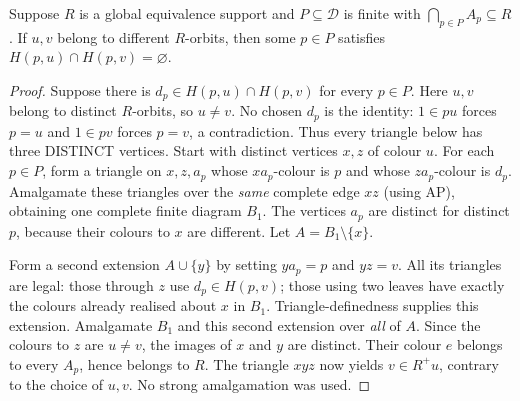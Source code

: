 \begin{lemma}\label{lem:rh-separator}
Suppose $R$ is a global equivalence support and $P\subseteq\mathcal D$
is finite with $\bigcap_{p\in P}A_p\subseteq R$. If $u,v$ belong to
different $R$-orbits, then some $p\in P$ satisfies
$H(p,u)\cap H(p,v)=\varnothing$.
\end{lemma}
\begin{proof}
Suppose there is $d_p\in H(p,u)\cap H(p,v)$ for every $p\in P$.
Here $u,v$ belong to distinct $R$-orbits, so $u\ne v$.
No chosen $d_p$ is the identity: $1\in pu$ forces $p=u$
and $1\in pv$ forces $p=v$, a contradiction.
Thus every triangle below has three DISTINCT vertices.
Start with distinct vertices $x,z$ of colour $u$. For each $p\in P$,
form a triangle on $x,z,a_p$ whose $xa_p$-colour is $p$ and whose
$za_p$-colour is $d_p$. Amalgamate these triangles over the \emph{same}
complete edge $xz$ (using AP), obtaining one complete finite diagram
$B_1$.  The vertices $a_p$ are distinct for distinct $p$, because their
colours to $x$ are different. Let $A=B_1\setminus\{x\}$.

Form a second extension $A\cup\{y\}$ by setting $ya_p=p$ and $yz=v$.
All its triangles are legal: those through $z$ use
$d_p\in H(p,v)$; those using two leaves have exactly the colours
already realised about $x$ in $B_1$. Triangle-definedness supplies
this extension.  Amalgamate $B_1$ and this second extension over
\emph{all} of $A$. Since the colours to $z$ are $u\ne v$, the images of
$x$ and $y$ are distinct. Their colour $e$ belongs to every $A_p$,
hence belongs to $R$. The triangle $xyz$ now yields $v\in R^+u$,
contrary to the choice of $u,v$. No strong amalgamation was used.
\end{proof}

